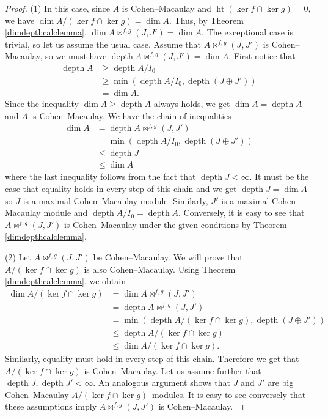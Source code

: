 \documentclass[10pt,a4paper]{amsart}
\DeclareMathOperator{\depth}{depth}
\DeclareMathOperator{\height}{ht}
\begin{document}
\begin{proof}
     (1) In this case, since $A$ is Cohen--Macaulay and $\height(\ker f \cap \ker g) = 0$, we have $\dim A/(\ker f \cap \ker g) = \dim A$. Thus, by Theorem \ref{dimdepthcalclemma}, $\dim A\bowtie^{f,g}(J,J')=\dim A$. The exceptional case is trivial, so let us assume the usual case. Assume that $A\bowtie^{f,g}(J,J')$ is Cohen--Macaulay, so we must have $\depth A\bowtie^{f,g}(J,J')=\dim A$. First notice that
        \begin{align*}
            \depth A&\ge\depth A/I_0\\
&\ge\min(\depth A/I_0 ,\depth (J\oplus J'))\\&=\dim A.
        \end{align*}
    Since the inequality $\dim A\ge \depth A$ always holds,  we get $\dim A=\depth A$ and $A$ is Cohen--Macaulay. We have the chain of inequalities
    \begin{align*}
        \dim A&=\depth A\bowtie^{f,g}(J,J')\\
        &=\min(\depth A/I_0 ,\depth (J\oplus J'))\\&\le\depth J\\&\le\dim A
    \end{align*}
    where the last inequality follows from the fact that $\depth J<\infty$. It must be the case that equality holds in every step of this chain and we get $\depth J=\dim A$ so $J$ is a maximal Cohen--Macaulay module. Similarly, $J'$ is a maximal Cohen--Macaulay module and $\depth A/I_0=\depth A$. Conversely, it is easy to see that $A\bowtie^{f,g}(J,J')$ is Cohen--Macaulay under the given conditions by Theorem \ref{dimdepthcalclemma}.\medskip

    (2) Let $A\bowtie^{f,g}(J,J')$ be Cohen--Macaulay. We will prove that $A/(\ker f\cap \ker g)$ is also Cohen--Macaulay. Using Theorem \ref{dimdepthcalclemma}, we obtain
        \begin{align*}
            \dim A/(\ker f\cap\ker g)&=\dim A\bowtie^{f,g}(J,J')\\&=\depth A\bowtie^{f,g}(J,J')\\
&=\min(\depth A/(\ker f\cap\ker g) ,\depth (J\oplus J'))\\&\le\depth A/(\ker f\cap\ker g)\\&\le\dim A/(\ker f\cap\ker g).
        \end{align*}
        Similarly, equality must hold in every step of this chain. Therefore we get that $A/(\ker f\cap\ker g)$ is Cohen--Macaulay. Let us assume further that $\depth J,\depth J'<\infty$. An analogous argument shows that $J$ and $J'$ are big Cohen--Macaulay $A/(\ker f\cap\ker g)$--modules. It is easy to see conversely that these assumptions imply $A\bowtie^{f,g}(J,J')$ is Cohen--Macaulay.
\end{proof}
\end{document}
